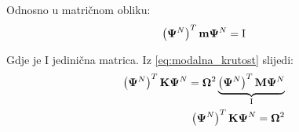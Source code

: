 Odnosno u matričnom obliku:
\begin{equation}\label{eq:relacija_normirani_matricno}
    \left(\mathbf{\Psi}^N\right)^T\mathbf{m}\mathbf{\Psi}^N=\text{I}
\end{equation}

Gdje je I jedinična matrica. Iz \eqref{eq:modalna_krutost} slijedi:
\begin{equation}
    \begin{split}
        \left(\mathbf{\Psi}^N\right)^T\mathbf{K}\mathbf{\Psi}^N=\mathbf{\Omega}^2\underbrace{\left(\mathbf{\Psi}^N\right)^T\mathbf{M}\mathbf{\Psi}^N}_{\text{I}} \notag\\
        \left(\mathbf{\Psi}^N\right)^T\mathbf{K}\mathbf{\Psi}^N=\mathbf{\Omega}^2\label{eq:normirana_krutost}
    \end{split}
\end{equation}


